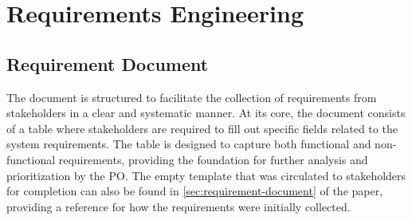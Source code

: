\newpage


\section{Requirements Engineering}\label{sec:requirements-engineering}

\subsection{Requirement Document}\label{subsec:requirement-document}

The document is structured to facilitate the collection of requirements from stakeholders in a clear and systematic
manner. At its core, the document consists of a table where stakeholders are required to fill out specific fields
related to the system requirements. The table is designed to capture both functional and non-functional requirements,
providing the foundation for further analysis and prioritization by the \ac{PO}. The empty template that was circulated
to stakeholders for completion can also be found in \ref{sec:requirement-document} of the paper, providing a
reference for how the requirements were initially collected.

\begin{table}[H]
    \centering
    \footnotesize
    \caption[Requirement Collection Table]{Requirement Collection Table \footnotemark}
    \label{tab:requirement_collection_table}
\end{table}

